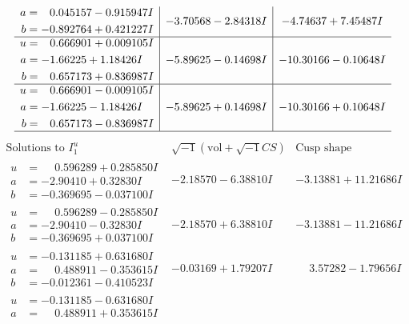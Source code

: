 \documentclass[1p]{elsarticle_modified}
\theoremstyle{definition}
\newcommand{\I}{\sqrt{-1}}
\begin{document}
$$\begin{array}{c|c|c}
\begin{aligned}
a &= \phantom{-}0.045157 - 0.915947 I \\
b &= -0.892764 + 0.421227 I\end{aligned}
 & -3.70568 - 2.84318 I & -4.74637 + 7.45487 I \\ \hline\begin{aligned}
u &= \phantom{-}0.666901 + 0.009105 I \\
a &= -1.66225 + 1.18426 I \\
b &= \phantom{-}0.657173 + 0.836987 I\end{aligned}
 & -5.89625 - 0.14698 I & -10.30166 - 0.10648 I \\ \hline\begin{aligned}
u &= \phantom{-}0.666901 - 0.009105 I \\
a &= -1.66225 - 1.18426 I \\
b &= \phantom{-}0.657173 - 0.836987 I\end{aligned}
 & -5.89625 + 0.14698 I & -10.30166 + 0.10648 I\\
 \hline 
 \end{array}$$\newpage$$\begin{array}{c|c|c}  
\text{Solutions to }I^u_{1}& \I (\text{vol} + \sqrt{-1}CS) & \text{Cusp shape}\\
 \hline 
\begin{aligned}
u &= \phantom{-}0.596289 + 0.285850 I \\
a &= -2.90410 + 0.32830 I \\
b &= -0.369695 - 0.037100 I\end{aligned}
 & -2.18570 - 6.38810 I & -3.13881 + 11.21686 I \\ \hline\begin{aligned}
u &= \phantom{-}0.596289 - 0.285850 I \\
a &= -2.90410 - 0.32830 I \\
b &= -0.369695 + 0.037100 I\end{aligned}
 & -2.18570 + 6.38810 I & -3.13881 - 11.21686 I \\ \hline\begin{aligned}
u &= -0.131185 + 0.631680 I \\
a &= \phantom{-}0.488911 - 0.353615 I \\
b &= -0.012361 - 0.410523 I\end{aligned}
 & -0.03169 + 1.79207 I & \phantom{-}3.57282 - 1.79656 I \\ \hline\begin{aligned}
u &= -0.131185 - 0.631680 I \\
a &= \phantom{-}0.488911 + 0.353615 I \\

\end{aligned}
\end{array}$$
\end{document}
